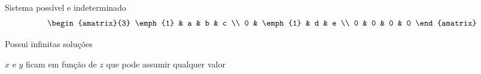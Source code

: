 \begin{question}
  Sistema possível e indeterminado
  \[
    \begin{amatrix}{3}
      \emph{1} & a        & b & c \\
      0        & \emph{1} & d & e \\
      0        & 0        & 0 & 0
    \end{amatrix}
  \]

  \pause
  Possui infinitas soluções

  \pause
  $x$ e $y$ ficam em função de $z$ que pode assumir qualquer valor
\end{question}

